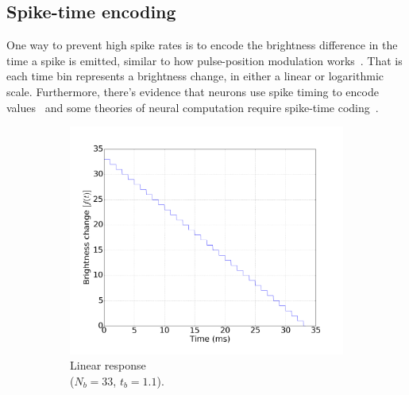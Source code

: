 \documentclass[conference]{IEEEtran}
\begin{document}
\subsection{Spike-time encoding}
\label{sec:output-modes}

One way to prevent high spike rates is to encode the brightness difference in the time a spike is emitted, similar to how pulse-position modulation works~\cite{book:ppm}. That is each time bin represents a brightness change, in either a linear or logarithmic scale. Furthermore, there's evidence that neurons use spike timing to encode values~\cite{Singer1999189} and some theories of neural computation require spike-time coding~\cite{izhikevich2006polychronization}. 


\begin{figure}[hbt]
  \captionsetup[subfigure]{justification=centering}
  \begin{center}
    \begin{subfigure}[b]{0.25\textwidth}
      \includegraphics[width=\textwidth]{linear_response_graph}
      \caption{Linear response \\($N_{b}=33$, $t_{b}=1.1$).}
      \label{fig:linear_time_resp}
    \end{subfigure}~
    \begin{subfigure}[b]{0.25\textwidth}

\end{subfigure}
\end{center}
\end{figure}
\end{document}
